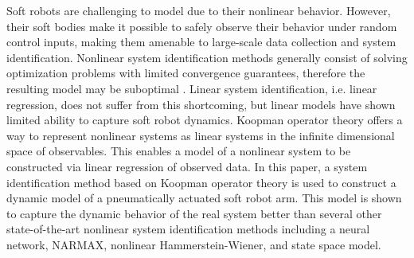 Soft robots are challenging to model due to their nonlinear behavior.
However, their soft bodies make it possible to safely observe their behavior under random control inputs, making them amenable to large-scale data collection and system identification.
Nonlinear system identification methods generally consist of solving optimization problems with limited convergence guarantees, therefore the resulting model may be suboptimal .
Linear system identification, i.e. linear regression, does not suffer from this shortcoming, but linear models have shown limited ability to capture soft robot dynamics.
Koopman operator theory offers a way to represent nonlinear systems as linear systems in the infinite dimensional space of observables.
This enables a model of a nonlinear system to be constructed via linear regression of observed data.
In this paper, a system identification method based on Koopman operator theory is used to construct a dynamic model of a pneumatically actuated soft robot arm.
This model is shown to capture the dynamic behavior of the real system  better than several other  state-of-the-art  nonlinear  system identification  methods  including  a  neural  network, NARMAX, nonlinear Hammerstein-Wiener, and state space model.
